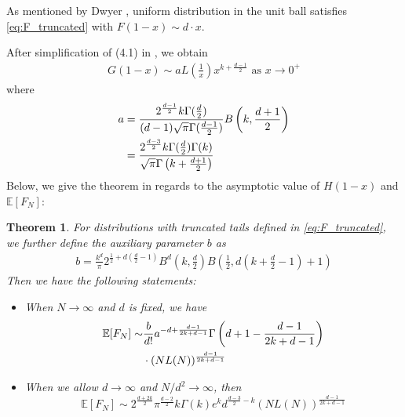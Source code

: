 \documentclass[conference,a4paper]{IEEEtran}
\def\E{\mathbb{E}}
\newtheorem{theorem}{Theorem}
\begin{document}
As mentioned by Dwyer \cite{dwyer1991convex}, uniform distribution
in the unit ball satisfies \eqref{eq:F_truncated} with
$F(1-x) \sim d\cdot x$.

After simplification of (4.1) in \cite{dwyer1991convex}, we obtain
\begin{align}
    G(1-x) \sim a
    L\left(\frac{1}{x} \right)
    x^{k+\frac{d-1}{2}} \textrm{ as } x \to 0^+ 
    \label{eq:truncated_G_1_x}
\end{align}
where
\begin{align}
a &=\frac{2^{\frac{d-1}{2}} k \Gamma(\frac{d}{2})}
    {(d-1) \sqrt{\pi} \Gamma(\frac{d-1}{2})}
    B\left(k, \frac{d+1}{2}\right) \notag \\
    &= \frac{2^{\frac{d-3}{2}} k \Gamma(\frac{d}{2})\Gamma(k)}
    {\sqrt{\pi} \Gamma\left(k+\frac{d+1}{2}\right)}
    \label{eq:a}
\end{align}
Below, we give the theorem in regards to the asymptotic value of $H(1-x)$ and $\E[F_N]$:
\begin{theorem}\label{thm:truncated_tails}
     For distributions with truncated tails
     defined in \eqref{eq:F_truncated}, we further define
     the auxiliary parameter $b$ as
     \begin{align}
          b =  \frac{k^d}{\pi}
          2^{\frac{1}{2} + d(\frac{d}{2}-1)} B^d\left(k, \frac{d}{2}\right)
          B\left( \frac{1}{2},
          d\left(k+\frac{d}{2} -1 \right)+1 \right)
          \label{eq:b}
      \end{align}     
     Then we have
 the following statements:
\begin{itemize}
     \item When $N\to \infty$ and $d$ is fixed, we have
     \begin{align}\label{eq:efn_truncated_formula}
          \E[F_N] \sim &\frac{b}{d!}a^{-d+\frac{d-1}{2k+d-1}}
          \Gamma 
          \left(d+1-\frac{d-1}{2k+d-1}\right)
          \notag\\
          &\cdot (NL(N))^{\frac{d-1}{2k+d-1}}
      \end{align}
     \item  When we allow $d\to \infty$ and $N/d^2 \to \infty$, then
     \begin{equation}\label{eq:truncated_d_inf}
      \E[F_N] \sim 2^{\frac{d+2k}{2}}\pi^{\frac{d-2}{2}} k\Gamma(k)e^k d^{\frac{d-3}{2}-k}
      (NL(N))^{\frac{d-1}{2k+d-1}}
     \end{equation}    
\end{itemize}
\end{theorem}
\end{document}
